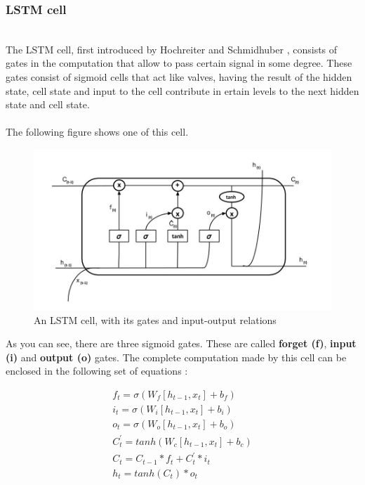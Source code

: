 \documentclass{llncs}
\begin{document}
\subsubsection{LSTM cell}~\\

The LSTM cell, first introduced by Hochreiter and Schmidhuber \cite{LSTM}, consists of gates in the computation that allow to pass certain signal in some degree. These gates consist of sigmoid cells that act like valves, having the result of the hidden state, cell state and input to the cell contribute in ertain levels to the next hidden state and cell state.
\\
\\
The following figure shows one of this cell.

\begin{figure}[H]
    \centering
    \includegraphics[scale=0.4]{../_img/img_lstmcell.jpg}
    \caption{An LSTM cell, with its gates and input-output relations}
    \label{fig:img_lstmcell}
\end{figure}

As you can see, there are three sigmoid gates. These are called \textbf{forget (f)}, \textbf{input (i)} and \textbf{output (o)} gates. The complete computation made by this cell can be enclosed in the following set of equations :

\begin{equation}
    \begin{gathered}
    f_{t} = \sigma( W_{f} [ h_{t - 1}, x_{t} ] + b_{f} ) \\
    i_{t} = \sigma( W_{i} [ h_{t - 1}, x_{t} ] + b_{i} ) \\
    o_{t} = \sigma( W_{o} [ h_{t - 1}, x_{t} ] + b_{o} ) \\
    C^{'}_{t} = tanh( W_{c} [ h_{t-1}, x_{t} ] + b_{c} ) \\
    C_{t} = C_{t-1} * f_{t} + C^{'}_{t} * i_{t} \\
    h_{t} = tanh( C_{t} ) * o_{t}
    \end{gathered}
\end{equation}
\end{document}
